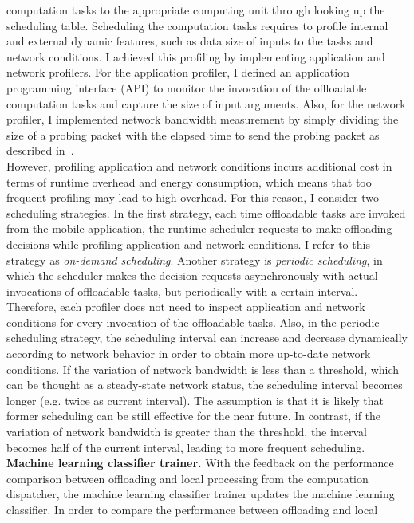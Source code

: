 {{computation tasks to the appropriate computing unit through looking up
the scheduling table.
%
Scheduling the computation tasks requires to profile internal
and external dynamic features, such as data size of inputs to the tasks
and network conditions. 
%
I achieved this profiling by implementing application and network
profilers.
%
For the application profiler, I defined an application programming
interface (API) to monitor the invocation of the offloadable computation
tasks and capture the size of input arguments.
%
Also, for the network profiler, I implemented network bandwidth
measurement by simply dividing the size of a probing packet with the elapsed
time to send the probing packet as described in~\cite{nws}.\\
%
However, profiling application and network conditions incurs
additional cost in terms of runtime overhead and energy consumption,
which means that too frequent profiling may lead to high overhead.
%
For this reason, I consider two scheduling strategies.
%
In the first strategy, each time offloadable tasks are invoked from the
mobile application, the runtime scheduler requests to make offloading
decisions while profiling application and network conditions.
%
I refer to this strategy as \textit{on-demand scheduling}.
%
Another strategy is \textit{periodic scheduling}, in which the
scheduler makes the decision requests asynchronously with actual
invocations of offloadable tasks, but periodically with a certain
interval.
%
Therefore, each profiler does not need to inspect application
and network conditions for every invocation of the offloadable tasks.
%
Also, in the periodic scheduling strategy, the scheduling interval
can increase and decrease dynamically according to network behavior
in order to obtain more up-to-date network conditions.
%
If the variation of network bandwidth is less than a threshold, which
can be thought as a steady-state network status, the scheduling interval 
becomes longer (e.g. twice as current interval).
%
The assumption is that it is likely that former scheduling can be 
still effective for the near future.
%
In contrast, if the variation of network bandwidth is greater than the
threshold, the interval becomes half of the current interval, leading to
more frequent scheduling.\\
%
\textbf{Machine learning classifier trainer.} With the feedback on the
performance comparison between offloading and local processing from the
computation dispatcher, the machine learning classifier trainer updates
the machine learning classifier.
%
In order to compare the performance between offloading and local
}}

